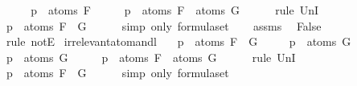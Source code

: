 \begin{isabellebody}
%
\isadelimproof
%
\endisadelimproof
%
\isatagproof
{}\isamarkupfalse%
\ \isanewline
\ \ \isamarkupfalse%
\ {\isachardoublequoteopen}p\ {\isasymin}\ atoms\ F{\isachardoublequoteclose}\isanewline
\ \ \isamarkupfalse%
\ \isamarkupfalse%
\ {\isachardoublequoteopen}p\ {\isasymin}\ atoms\ F\ {\isasymunion}\ atoms\ G{\isachardoublequoteclose}\isanewline
\ \ \ \ \isamarkupfalse%
\ {\isacharparenleft}rule\ UnI{}{\isacharparenright}\isanewline
\ \ \isamarkupfalse%
\ \isamarkupfalse%
\ {\isachardoublequoteopen}p\ {\isasymin}\ atoms\ {\isacharparenleft}F\ \isactrlbold {\isasymand}\ G{\isacharparenright}{\isachardoublequoteclose}\isanewline
\ \ \ \ \isamarkupfalse%
\ {\isacharparenleft}simp\ only{\isacharcolon}\ formula{\isachardot}set{\isacharparenleft}{}{\isacharparenright}{\isacharparenright}\isanewline
\ \ \isamarkupfalse%
\ assms\ \isamarkupfalse%
\ False\ \isanewline
\ \ \ \ \isamarkupfalse%
\ {\isacharparenleft}rule\ notE{\isacharparenright}\isanewline
{}\isamarkupfalse%
%
\endisatagproof
{\isafoldproof}%
%
\isadelimproof
\isanewline
%
\endisadelimproof
\isanewline
{}\isamarkupfalse%
\ irrelevant{\isacharunderscore}atom{\isacharunderscore}and{\isacharunderscore}l{}{\isacharcolon}\isanewline
\ \ \ {\isachardoublequoteopen}p\ {\isasymnotin}\ atoms\ {\isacharparenleft}F\ \isactrlbold {\isasymand}\ G{\isacharparenright}{\isachardoublequoteclose}\isanewline
\ \ \ \ \ {\isachardoublequoteopen}p\ {\isasymnotin}\ atoms\ G{\isachardoublequoteclose}\isanewline
%
\isadelimproof
%
\endisadelimproof
%
\isatagproof
{}\isamarkupfalse%
\ \isanewline
\ \ \isamarkupfalse%
\ {\isachardoublequoteopen}p\ {\isasymin}\ atoms\ G{\isachardoublequoteclose}\isanewline
\ \ \isamarkupfalse%
\ \isamarkupfalse%
\ {\isachardoublequoteopen}p\ {\isasymin}\ atoms\ F\ {\isasymunion}\ atoms\ G{\isachardoublequoteclose}\isanewline
\ \ \ \ \isamarkupfalse%
\ {\isacharparenleft}rule\ UnI{}{\isacharparenright}\isanewline
\ \ \isamarkupfalse%
\ \isamarkupfalse%
\ {\isachardoublequoteopen}p\ {\isasymin}\ atoms\ {\isacharparenleft}F\ \isactrlbold {\isasymand}\ G{\isacharparenright}{\isachardoublequoteclose}\isanewline
\ \ \ \ \isamarkupfalse%
\ {\isacharparenleft}simp\ only{\isacharcolon}\ formula{\isachardot}set{\isacharparenleft}{}{\isacharparenright}{\isacharparenright}\isanewline

\end{isabellebody}
